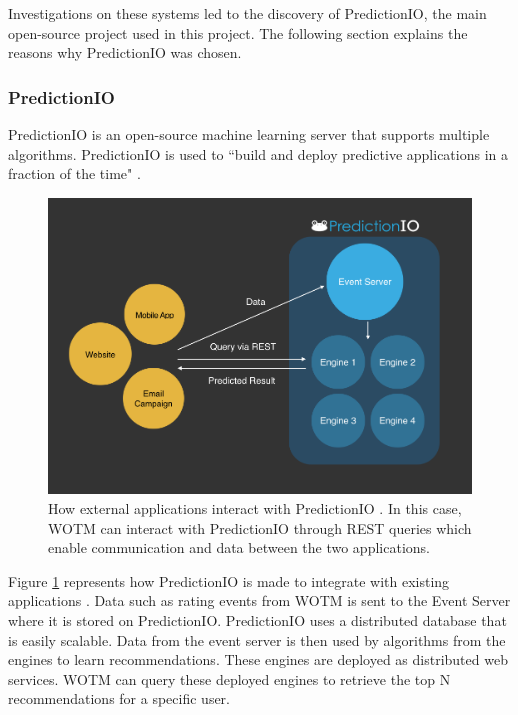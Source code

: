 Investigations on these systems led to the discovery of PredictionIO, the main open-source project used in this project. The following section explains the reasons why PredictionIO was chosen. 

\subsubsection{PredictionIO}

PredictionIO is an open-source machine learning server that supports multiple algorithms. PredictionIO is used to ``build and deploy predictive applications in a fraction of the time" \cite{predictionio, predictionio2}.

\begin{figure}
\centering
\includegraphics[scale=0.35]{images/predictionIO}
\caption{ How external applications interact with PredictionIO \cite{predictionio}. In this case, WOTM can interact with PredictionIO through REST queries which enable communication and data between the two applications.}
\label{fig:predictionIO}
\end{figure}


Figure \ref{fig:predictionIO} represents how PredictionIO is made to integrate with existing applications \cite{predictionio}. Data such as rating events from WOTM is sent to the Event Server where it is stored on PredictionIO. PredictionIO uses a distributed database that is easily scalable. Data from the event server is then used by algorithms from the engines to learn recommendations. These engines are deployed as distributed web services. WOTM can query these deployed engines to retrieve the top N recommendations for a specific user. 

